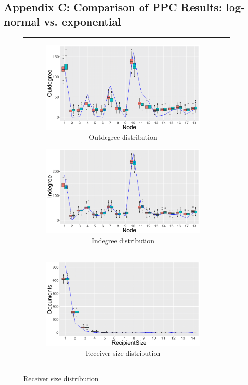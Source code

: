 \documentclass[ba]{imsart}
\numberwithin{equation}{section}
\theoremstyle{plain}
\begin{document}
	\subsection*{Appendix C: Comparison of PPC Results: log-normal vs. exponential}\label{appendix: PPCexp}
		\begin{figure}[H]
			\centering
			\begin{tabular}[t]{cc}
				\begin{subfigure}[b]{0.495\textwidth}
					\caption{Outdegree distribution}
					\includegraphics[width=\textwidth]{img/outdegree2-1.png}	
				\end{subfigure}
				\begin{subfigure}[b]{0.495\textwidth}
					\caption{Indegree distribution}
					\includegraphics[width=\textwidth]{img/indegree2-1.png}	
				\end{subfigure}\\
				\begin{subfigure}[b]{0.495\textwidth}
					\caption{Receiver size distribution}
					\includegraphics[width=\textwidth]{img/recipientsize2-1.png}	

\end{subfigure}
\end{tabular}
\end{figure}
\end{document}
